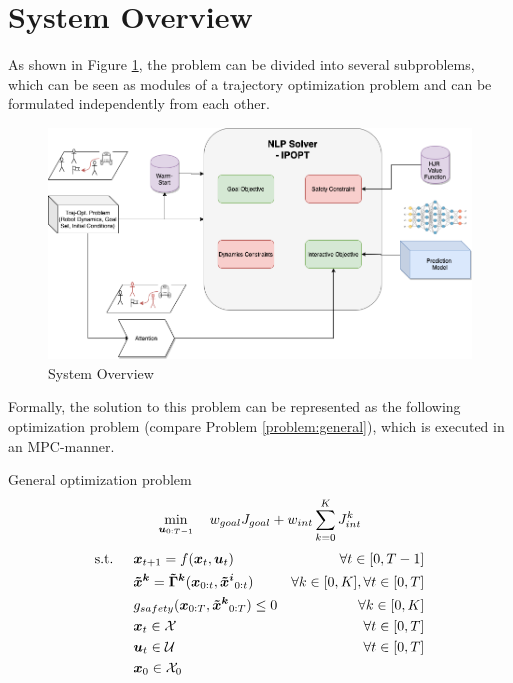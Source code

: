 \section{System Overview}
\label{text:approach/overview}
As shown in Figure \ref{img:information_flow}, the problem can be divided into several subproblems, which can be seen as modules of a trajectory optimization problem and can be formulated independently from each other. 

\begin{figure}[!ht]
\begin{center}
\includegraphics[width=\textwidth]{images/system.png}
\caption{System Overview}
\label{img:information_flow}
\end{center}
\end{figure}

Formally, the solution to this problem can be represented as the following optimization problem (compare Problem \ref{problem:general}), which is executed in an MPC-manner. \\

\begin{problem}{\textrm{General optimization problem}}
\begin{equation}
\min_{\boldsymbol{u}_{0:T-1}} \quad w_{goal} J_{goal} + w_{int} \sum_{k=0}^K J_{int}^k
\end{equation}
\begin{align}
\textrm{s.t. } \quad & \x_{t+1} = \f(\x_t, \u_t) & \forall t \in [0, T - 1] \\
& \xped[k] = \distmodel[k](\x_{0:t}, \xped[i]_{0:t}) & \forall k \in [0, K], \forall t \in [0, T]\\
& g_{safety}(\x_{0:T}, \xped[k]_{0:T}) \leq 0 & \forall k \in [0, K] \\
& \x_t \in \xset & \forall t \in [0, T]\\
& \u_t \in \uset & \forall t \in [0, T]\\
& \x_0 \in \xset_0
\end{align} 
\label{problem:general}
\end{problem}

